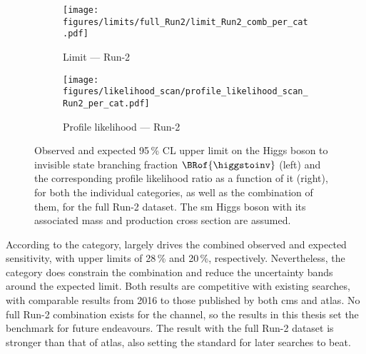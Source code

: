 \begin{figure}[htbp]
    \centering
    \begin{subfigure}[t]{0.45\textwidth}  %
        \texttt{[image: figures/limits/full\_Run2/limit\_Run2\_comb\_per\_cat.pdf]}
        \caption{Limit --- Run-2}
    \end{subfigure}
    \hspace{0.05\textwidth}
    \begin{subfigure}[t]{0.45\textwidth}
        \texttt{[image: figures/likelihood\_scan/profile\_likelihood\_scan\_Run2\_per\_cat.pdf]}
        \caption{Profile likelihood --- Run-2}
    \end{subfigure}
    \caption[Observed and expected 95\,\% CL upper limit on the Higgs boson to invisible state branching fraction $\BRof{\higgstoinv}$ and the corresponding profile likelihood ratio as a function of it, for both the individual categories, as well as the combination of them, for the full Run-2 dataset]{Observed and expected 95\,\% CL upper limit on the Higgs boson to invisible state branching fraction $\BRof{\higgstoinv}$ (left) and the corresponding profile likelihood ratio as a function of it (right), for both the individual categories, as well as the combination of them, for the full Run-2 dataset. The \acrlong{sm} Higgs boson with its associated mass and production cross section are assumed.}
    \label{fig:htoinv_limit_likelihood_Run2_per_cat}
\end{figure}

According to the category, \VH largely drives the combined observed and expected sensitivity, with upper limits of 28\,\% and 20\,\%, respectively. Nevertheless, the \ttH category does constrain the combination and reduce the uncertainty bands around the expected limit. Both results are competitive with existing searches, with comparable results from 2016 to those published by both \acrshort{cms} and \acrshort{atlas}. No full Run-2 combination exists for the \VH channel, so the results in this thesis set the benchmark for future endeavours. The \ttH result with the full Run-2 dataset is stronger than that of \acrshort{atlas}, also setting the standard for later searches to beat.

